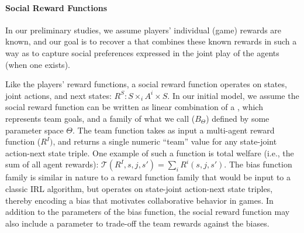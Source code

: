 
\vspace{\up}
\paragraph{Social Reward Functions}

In our preliminary studies, we assume players' individual (game)
rewards are known, and our goal is to recover a  that combines these known rewards in such a way as to
capture social preferences expressed in the joint play of the agents
(when one exists).

Like the players' reward functions, a social reward function operates
on states, joint actions, and next states: $R^S : S \times_i A^i
\times S$.  In our initial model, we assume the social reward function
can be written as linear combination of a , which
represents team goals,
and a family of what we call  ($B_\Theta$)
defined by some parameter space $\Theta$.  The team function takes as
input a multi-agent reward function ($R^I)$, and returns a single
numeric ``team'' value for any state-joint action-next state
triple. One example of such a function is total welfare (i.e., the sum
of all agent rewards): ${\mathcal T}(R^I, s, j, s') = \sum_i R^i(s, j, s')$.
%
The bias function family is similar in nature to a reward function
family that would be input to a classic IRL algorithm, but operates on
state-joint action-next state triples, thereby encoding a bias that
motivates collaborative behavior in games.  In addition to the
parameters of the bias function, the social reward function may also
include a parameter
to trade-off the team rewards against the biases.

